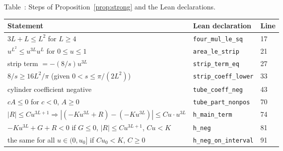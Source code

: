 \documentclass[11pt,a4paper]{article}
\theoremstyle{definition}
\theoremstyle{remark}
\begin{document}
\begin{center}\small
{}\label{tab:corr}Table~\thetable: Steps of Proposition~\ref{prop:strong} and the Lean declarations.\\[4pt]
\begin{tabular}{@{}lll@{}}\toprule
Statement & Lean declaration & Line\\\midrule
$3L+L\le L^2$ for $L\ge4$ & \texttt{four\_mul\_le\_sq} & 17\\
$u^{L^2}\le u^{3L}u^L$ for $0\le u\le1$ & \texttt{area\_le\_strip} & 21\\
strip term $=-(8/s)u^{3L}$ & \texttt{strip\_term\_eq} & 27\\
$8/s\ge16L^2/\pi$ (given $0<s\le\pi/(2L^2)$) & \texttt{strip\_coeff\_lower} & 33\\
cylinder coefficient negative & \texttt{tube\_coeff\_neg} & 43\\
$cA\le0$ for $c<0$, $A\ge0$ & \texttt{tube\_part\_nonpos} & 70\\
$|R|\le Cu^{3L+1}\Rightarrow|(-Ku^{3L}+R)-(-Ku^{3L})|\le Cu\cdot u^{3L}$ & \texttt{h\_main\_term} & 74\\
$-Ku^{3L}+G+R<0$ if $G\le0$, $|R|\le Cu^{3L+1}$, $Cu<K$ & \texttt{h\_neg} & 81\\
the same for all $u\in(0,u_0]$ if $Cu_0<K$, $C\ge0$ & \texttt{h\_neg\_on\_interval} & 91\\\bottomrule
\end{tabular}
\end{center}
\end{document}
